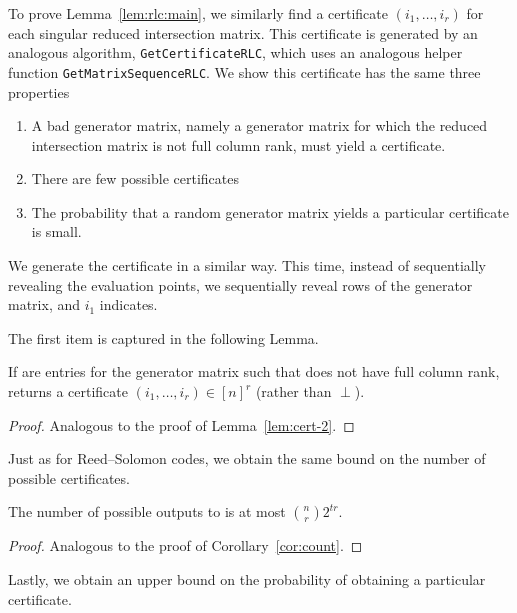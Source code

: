 \documentclass{article}[11pt]
\begin{document}
To prove Lemma~\ref{lem:rlc:main}, we similarly find a certificate $(i_1,\dots,i_r)$ for each singular reduced intersection matrix. 
This certificate is generated by an analogous algorithm, \texttt{GetCertificateRLC}, which uses an analogous helper function \texttt{GetMatrixSequenceRLC}.
We show this certificate has the same three properties
\begin{enumerate}
  \item A bad generator matrix, namely a generator matrix for which the reduced intersection matrix is not full column rank, must yield a certificate.
  \item There are few possible certificates
  \item The probability that a random generator matrix yields a particular certificate is small.
\end{enumerate}
We generate the certificate in a similar way. This time, instead of sequentially revealing the evaluation points, we sequentially reveal rows of the generator matrix, and $i_1$ indicates.

The first item is captured in the following Lemma.
\begin{lemma}
  If  are entries for the generator matrix such that  does not have full column rank,  returns a certificate $(i_1,\dots,i_r) \in [n]^r$ (rather than $\perp$).
  \label{}
\end{lemma}
\begin{proof}
  Analogous to the proof of Lemma~\ref{lem:cert-2}.
\end{proof}

Just as for Reed--Solomon codes, we obtain the same bound on the number of possible certificates.
\begin{lemma}
  The number of possible outputs to  is at most $\binom{n}{r}2^{tr}$.
  \label{lem:rlc:count}
\end{lemma}
\begin{proof}
   Analogous to the proof of Corollary~\ref{cor:count}.
\end{proof}

Lastly, we obtain an upper bound on the probability of obtaining a particular certificate.
\end{document}
